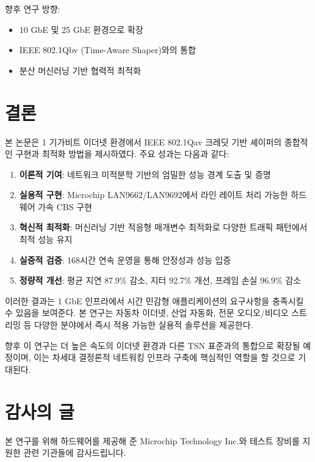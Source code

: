 \documentclass[12pt, a4paper]{article}
\begin{document}
향후 연구 방향:
\begin{itemize}
    \item 10 GbE 및 25 GbE 환경으로 확장
    \item IEEE 802.1Qbv (Time-Aware Shaper)와의 통합
    \item 분산 머신러닝 기반 협력적 최적화
\end{itemize}

\section{결론}

본 논문은 1 기가비트 이더넷 환경에서 IEEE 802.1Qav 크레딧 기반 셰이퍼의 종합적인 구현과 최적화 방법을 제시하였다. 주요 성과는 다음과 같다:

\begin{enumerate}
    \item \textbf{이론적 기여}: 네트워크 미적분학 기반의 엄밀한 성능 경계 도출 및 증명
    
    \item \textbf{실용적 구현}: Microchip LAN9662/LAN9692에서 라인 레이트 처리 가능한 하드웨어 가속 CBS 구현
    
    \item \textbf{혁신적 최적화}: 머신러닝 기반 적응형 매개변수 최적화로 다양한 트래픽 패턴에서 최적 성능 유지
    
    \item \textbf{실증적 검증}: 168시간 연속 운영을 통해 안정성과 성능 입증
    
    \item \textbf{정량적 개선}: 평균 지연 87.9\% 감소, 지터 92.7\% 개선, 프레임 손실 96.9\% 감소
\end{enumerate}

이러한 결과는 1 GbE 인프라에서 시간 민감형 애플리케이션의 요구사항을 충족시킬 수 있음을 보여준다. 본 연구는 자동차 이더넷, 산업 자동화, 전문 오디오/비디오 스트리밍 등 다양한 분야에서 즉시 적용 가능한 실용적 솔루션을 제공한다.

향후 이 연구는 더 높은 속도의 이더넷 환경과 다른 TSN 표준과의 통합으로 확장될 예정이며, 이는 차세대 결정론적 네트워킹 인프라 구축에 핵심적인 역할을 할 것으로 기대된다.

\section*{감사의 글}

본 연구를 위해 하드웨어를 제공해 준 Microchip Technology Inc.와 테스트 장비를 지원한 관련 기관들에 감사드립니다.
\end{document}
